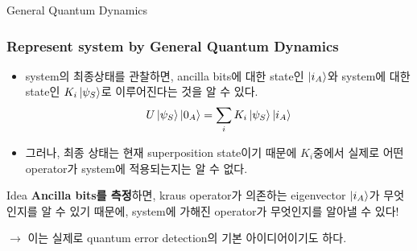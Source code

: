 \documentclass[9pt]{beamer}
\begin{document}
\begin{section}{General Quantum Dynamics}
        \begin{frame}
            \frametitle{Represent system by General Quantum Dynamics}
            \begin{itemize}
                \item system의 최종상태를 관찰하면, ancilla bits에 대한 state인 $\ket{i_A}$와 system에 대한 state인 $K_i \ket{\psi_S}$로 이루어진다는 것을 알 수 있다.
                $$ U \ket{\psi_S} \ket{0_A} = \sum_i K_i \ket{\psi_S} \ket{i_A}$$
                \item 그러나, 최종 상태는 현재 superposition state이기 때문에 $K_i$중에서 실제로 어떤 operator가 system에 적용되는지는 알 수 없다.                    
            \end{itemize}
            \vspace{0.2cm}
            \begin{block}{Idea}
                \textbf{Ancilla bits를 측정}하면, kraus operator가 의존하는 eigenvector $\ket{i_A}$가 무엇인지를 알 수 있기 때문에, system에 가해진 operator가 무엇인지를 알아낼 수 있다! 
            \end{block}
            \vspace{0.2cm}
            $\rightarrow$ 이는 실제로 quantum error detection의 기본 아이디어이기도 하다.
        \end{frame}
    \end{section}
\end{document}
